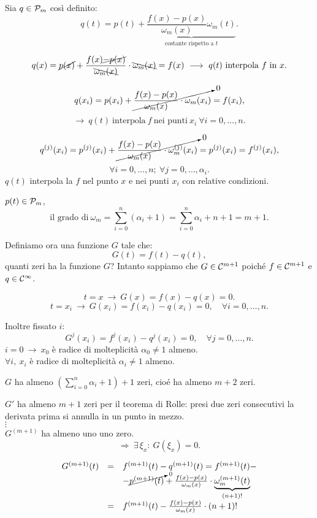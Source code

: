 \begin{dimo}Sia $q \in \mathcal{P}_m$ così definito:
\[
q(t) = p(t) + \underbrace{\frac{f(x)-p(x)}{\omega_m(x)}
\omega_m(t)}_{\textrm{costante rispetto a }t}.
\]

\[
q(x) = \cancel{p(x)} +\frac{f(x) \cancel{- p(x)}}{\bcancel{\omega_m(x)}}\cdot
\bcancel{\omega_m(x)} = f(x)\ \longrightarrow \ q(t) \ \textrm{interpola}\ f
\ \textrm{in}\ x.
\]

\[
q(x_i) = p(x_i) +\cancelto{0}{\frac{f(x)-p(x)}{\omega_m(x)}\cdot
\omega_m(x_i)} = f(x_i),\]\[ \longrightarrow \ q(t) \ \textrm{interpola}\ f
\ \textrm{nei punti}\ x_i \ \forall i = 0, \ldots, n.
\]

\[
q^{(j)}(x_i) = p^{(j)}(x_i) + \cancelto{0}{\frac{f(x)-p(x)}{\omega_m(x)}\cdot
\omega^{(j)}_m(x_i)} = p^{(j)}(x_i) = f^{(j)}(x_i),\]
\[\forall i = 0, \ldots, n;\ \forall j = 0, \ldots, \alpha_i.
\]
$q(t)$ interpola la $f$ nel punto $x$ e nei punti $x_i$ con relative
condizioni.

\begin{flushleft}
$p(t) \in \mathcal{P}_m$,
\[\textrm{il grado di}\ \omega_m = \sum_{i = 0}^n \left(\alpha_i +1 \right) =
\sum_{i=0}^n\alpha_i+n+1 = m+1.\]
\end{flushleft}
Definiamo ora una funzione $G$ tale che:
\[G(t) = f(t)-q(t),\]
quanti zeri ha la funzione $G$? Intanto sappiamo che $G \in \mathcal{C}^{m+1}$ poiché
$f \in \mathcal{C}^{m+1}$ e $q \in \mathcal{C}^{\infty}$.

\[t = x \ \longrightarrow \ G(x) = f(x) - q(x) = 0.\]
\[t = x_i \ \longrightarrow \ G(x_i) = f(x_i) - q(x_i) = 0,
\quad \forall i = 0, \ldots, n.\]

Inoltre fissato $i$:
\[G^j(x_i) = f^j(x_i) - q^j(x_i) = 0, \quad \forall j=0,\ldots, n.\]
$i = 0 \ \longrightarrow \ x_0$ è radice di molteplicità $\alpha_0 \neq 1$
almeno.\\
$\forall i, \  x_i$ è radice di molteplicità $\alpha_i \neq 1$
almeno.\\
\begin{flushleft}
$G$ ha almeno $\left( \sum_{i=0}^n\alpha_i + 1\right) +1$ zeri, cioé ha almeno
$m+2$ zeri.
\end{flushleft}
$G'$ ha almeno $m+1$ zeri per il teorema di Rolle: presi due zeri consecutivi
la derivata prima si annulla in un punto in mezzo.\\
$\vdots$\\
$G^{(m+1)}$ ha almeno uno uno zero.
\[
\Longrightarrow\ \exists\, \xi_x \colon \ G(\xi_x) =0.
\]

\[
\begin{array}{lcl}
G^{(m+1)}(t) & = & f^{(m+1)}(t) - q^{(m+1)}(t) =  f^{(m+1)}(t) - \\
& & - \cancelto{0}{p^{(m+1)}(t)} + \frac{f(x)-p(x)}{\omega_m(x)}\cdot
\underbrace{\omega^{(m+1)}_m(t)}_{(n+1)!} \\
& = & f^{(m+1)}(t) -  \frac{f(x)-p(x)}{\omega_m(x)}\cdot(n+1)!
\end{array}\]


\end{dimo}
